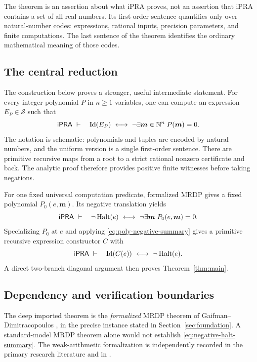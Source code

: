 The theorem is an assertion about what iPRA proves, not an assertion that
iPRA contains a set of all real numbers. Its first-order sentence quantifies
only over natural-number codes: expressions, rational inputs, precision
parameters, and finite computations. The last sentence of the theorem
identifies the ordinary mathematical meaning of those codes.

\subsection{The central reduction}

The construction below proves a stronger, useful intermediate statement.
For every integer polynomial $P$ in $n\ge1$ variables, one can compute an
expression $E_P\in\mathcal S$ such that
\begin{equation}\label{eq:poly-negative-summary}
 \mathsf{iPRA}\ \vdash\quad
 \operatorname{Id}(E_P)\ \longleftrightarrow\
 \neg\exists \boldsymbol m\in\mathbb N^n\;P(\boldsymbol m)=0.
\end{equation}
The notation is schematic: polynomials and tuples are encoded by natural
numbers, and the uniform version is a single first-order sentence. There
are primitive recursive maps from a root to a strict rational nonzero
certificate and back. The analytic proof therefore provides positive finite
witnesses before taking negations.

For one fixed universal computation predicate, formalized MRDP gives a fixed
polynomial $P_0(e,\boldsymbol m)$. Its negative translation yields
\begin{equation}\label{eq:negative-halt-summary}
 \mathsf{iPRA}\ \vdash\quad
 \neg\operatorname{Halt}(e)\ \longleftrightarrow\
 \neg\exists\boldsymbol m\;P_0(e,\boldsymbol m)=0.
\end{equation}
Specializing $P_0$ at $e$ and applying \eqref{eq:poly-negative-summary} gives
a primitive recursive expression constructor $C$ with
\begin{equation}\label{eq:main-reduction}
 \mathsf{iPRA}\ \vdash\quad
 \operatorname{Id}(C(e))\ \longleftrightarrow\ \neg\operatorname{Halt}(e).
\end{equation}
A direct two-branch diagonal argument then proves Theorem~\ref{thm:main}.

\subsection{Dependency and verification boundaries}

The deep imported theorem is the \emph{formalized} MRDP theorem of
Gaifman--Dimitracopoulos \cite{gd}, in the precise instance stated in
Section~\ref{sec:foundation}. A standard-model MRDP theorem alone would not
establish \eqref{eq:negative-halt-summary}. The weak-arithmetic formalization
is independently recorded in the primary research literature
\cite{cmy} and in \cite{jerabek}.

